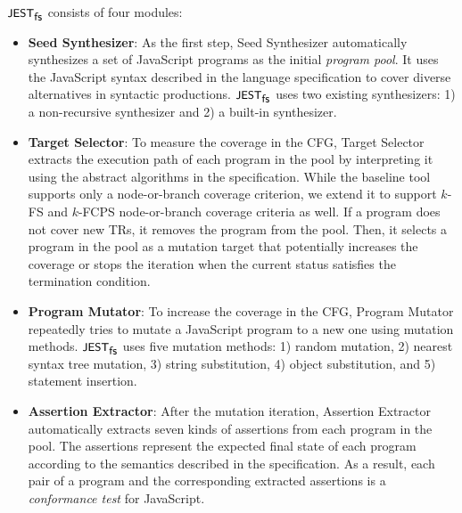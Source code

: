 

$\textsf{\small JEST}_{\textsf{\small fs}}$ consists of four modules:
\begin{itemize}
  \item \textsf{\textbf{Seed Synthesizer}}:
    As the first step, \textsf{Seed Synthesizer} automatically synthesizes a set
    of JavaScript programs as the initial \textit{program pool}.
    It uses the JavaScript syntax described in the language specification to
    cover diverse alternatives in syntactic productions.
    $\textsf{\small JEST}_{\textsf{\small fs}}$ uses two existing synthesizers: 1) a non-recursive synthesizer and
    2) a built-in synthesizer.
  \item \textsf{\textbf{Target Selector}}:
    To measure the coverage in the CFG, \textsf{Target Selector} extracts the
    execution path of each program in the pool by interpreting it using the
    abstract algorithms in the specification.
    While the baseline tool supports only a node-or-branch coverage criterion,
    we extend it to support $k$-FS and $k$-FCPS node-or-branch coverage
    criteria as well.
    If a program does not cover new TRs, it removes the program from the pool.
    Then, it selects a program in the pool as a mutation target that potentially
    increases the coverage or stops the iteration when the current status
    satisfies the termination condition.
  \item \textsf{\textbf{Program Mutator}}:
    To increase the coverage in the CFG, \textsf{Program Mutator} repeatedly
    tries to mutate a JavaScript program to a new one using mutation methods.
    $\textsf{\small JEST}_{\textsf{\small fs}}$ uses five mutation methods: 1) random mutation, 2)
    nearest syntax tree mutation, 3) string substitution, 4) object
    substitution, and 5) statement insertion.
  \item \textsf{\textbf{Assertion Extractor}}:
    After the mutation iteration, \textsf{Assertion Extractor} automatically
    extracts seven kinds of assertions from each program in the pool.
    The assertions represent the expected final state of each program according
    to the semantics described in the specification.
    As a result, each pair of a program and the corresponding extracted
    assertions is a \textit{conformance test} for JavaScript.
\end{itemize}


